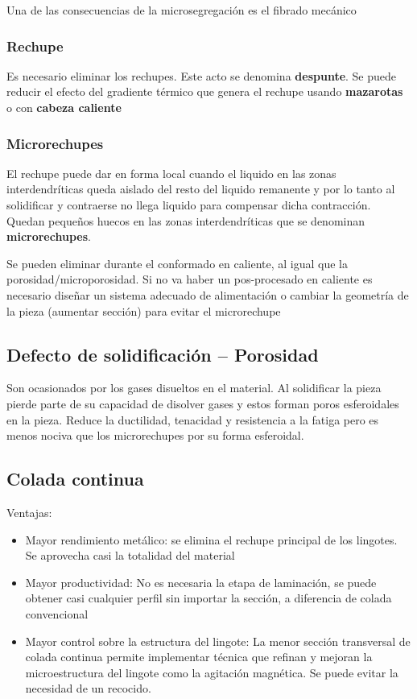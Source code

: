 Una de las consecuencias de la microsegregación es el fibrado mecánico

\subsubsection{Rechupe}
Es necesario eliminar los rechupes. Este acto se denomina \textbf{despunte}. Se puede reducir el efecto del gradiente térmico que genera el rechupe usando \textbf{mazarotas} o con \textbf{cabeza caliente}


\subsubsection{Microrechupes}

El rechupe puede dar en forma local cuando el liquido en las zonas interdendríticas queda aislado del resto del liquido remanente y por lo tanto al solidificar y contraerse no llega liquido para compensar dicha contracción. Quedan pequeños huecos en las zonas interdendríticas que se denominan \textbf{microrechupes}.

Se pueden eliminar durante el conformado en caliente, al igual que la porosidad/microporosidad. Si no va haber un pos-procesado en caliente es necesario diseñar un sistema adecuado de alimentación o cambiar la geometría de la pieza (aumentar sección) para evitar el microrechupe


\subsection[Porosidad]{Defecto de solidificación -- Porosidad}
Son ocasionados por los gases disueltos en el material. Al solidificar la pieza pierde parte de su capacidad de disolver gases y estos forman poros esferoidales en la pieza. Reduce la ductilidad, tenacidad y resistencia a la fatiga pero es menos nociva que los microrechupes por su forma esferoidal.


\subsection{Colada continua}

Ventajas:

\begin{itemize}
	\item Mayor rendimiento metálico: se elimina el rechupe principal de los lingotes. Se aprovecha casi la totalidad del material
	\item Mayor productividad: No es necesaria la etapa de laminación, se puede obtener casi cualquier perfil sin importar la sección, a diferencia de colada convencional
	\item Mayor control sobre la estructura del lingote: La menor sección transversal de colada continua permite implementar técnica que refinan y mejoran la microestructura del lingote como la agitación magnética. Se puede evitar la necesidad de un recocido.
\end{itemize}

